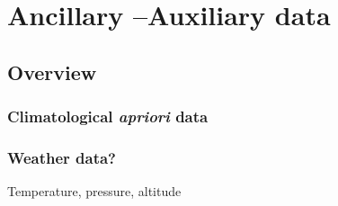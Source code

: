 \chapter{Ancillary --Auxiliary data}
\section{Overview}
\subsection{Climatological \textit{apriori} data} 	
\subsection{Weather data?}
Temperature, pressure, altitude



